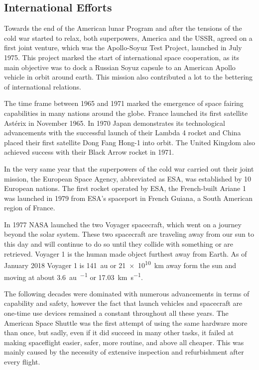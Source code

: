 \subsection{International Efforts}

Towards the end of the American lunar Program and after the tensions of the cold war started to relax, both superpowers, America and the USSR, agreed on a first joint venture, which was the Apollo-Soyuz Test Project, launched in July 1975. This project marked the start of international space cooperation, as its main objective was to dock a Russian Soyuz capsule to an American Apollo vehicle in orbit around earth. This mission also contributed a lot to the bettering of international relations.\cite{apollo-soyuz}

The time frame between 1965 and 1971 marked the emergence of space fairing capabilities in many nations around the globe. France launched its first satellite Astérix in November 1965. In 1970 Japan demonstrates its technological advancements with the successful launch of their Lambda 4 rocket and China placed their first satellite Dong Fang Hong-1 into orbit. The United Kingdom also achieved success with their Black Arrow rocket in 1971.\cite{fifty-years-sf}

In the very same year that the superpowers of the cold war carried out their joint mission, the European Space Agency, abbreviated as ESA, was established by 10 European nations. The first rocket operated by ESA, the French-built Ariane 1 was launched in 1979 from ESA's spaceport in French Guiana, a South American region of France.\cite{esa-history}

In 1977 NASA launched the two Voyager spacecraft, which went on a journey beyond the solar system. These two spacecraft are traveling away from our sun to this day and will continue to do so until they collide with something or are retrieved. Voyager 1 is the human made object furthest away from Earth. As of January 2018 Voyager 1 is \SI{141}{\astronomicalunit} or \SI{21e10}{\kilo\meter} away form the sun and moving at about \SI{3.6}{\astronomicalunit\per\year} or \SI{17.03}{\kilo\meter\per\second}.\cite{voyager}

The following decades were dominated with numerous advancements in terms of capability and safety, however the fact that launch vehicles and spacecraft are one-time use devices remained a constant throughout all these years. The American Space Shuttle was the first attempt of using the same hardware more than once, but sadly, even if it did succeed in many other tasks, it failed at making spaceflight easier, safer, more routine, and above all cheaper. This was mainly caused by the necessity of extensive inspection and refurbishment after every flight.\cite{space-shuttle-cost}

